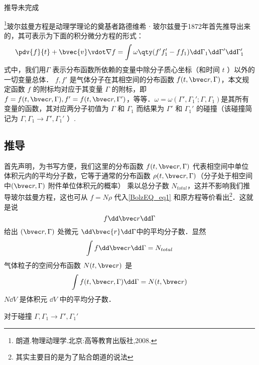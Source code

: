 
\begin{issues}

\issueDraft
推导未完成
\end{issues}

\footnote{朗道.物理动理学.北京:高等教育出版社,2008.}玻尔兹曼方程是动理学理论的奠基者路德维希 $\cdot$ 玻尔兹曼于1872年首先推导出来的，其可表示为下面的积分微分方程的形式：
\begin{equation}\label{BolzEQ_eq1}
\pdv{f}{t}+\bvec{v}\vdot\nabla f=\int\omega\qty(f'f_1'-ff_1)\dd\Gamma_1\dd\Gamma'\dd\Gamma_1'
\end{equation}
式中，我们用$\Gamma$ 表示分布函数所依赖的变量中除分子质心坐标（和时间 $t$ ）以外的一切变量总体． $f,f'$ 是气体分子在其相空间的分布函数 $f(t,\bvec r,\Gamma)$，本文规定函数 $f$ 的附标均对应于其变量 $\Gamma$ 的附标，即$f=f(t,\bvec r,\Gamma),f'=f(t,\bvec r,\Gamma')$，等等．$\omega=\omega(\Gamma',\Gamma_1';\Gamma,\Gamma_1)$是其所有变量的函数，其对应两分子初值为 $\Gamma$ 和 $\Gamma_1$ 而结果为 $\Gamma'$ 和 $\Gamma_1'$ 的碰撞（该碰撞简记为 $\Gamma,\Gamma_1\rightarrow\Gamma',\Gamma_1'$ ）. 
\subsection{推导}
首先声明，为书写方便，我们这里的分布函数 $f(t,\bvec r,\Gamma)$ 代表相空间中单位体积元内的平均分子数，它等于通常的分布函数 $\rho(t,\bvec r,\Gamma)$（分子处于相空间中$(\bvec r,\Gamma)$ 附件单位体积元的概率） 乘以总分子数 $N_{total}$，这并不影响我们推导玻尔兹曼方程，这也可从 $f=N\rho$ 代入\autoref{BolzEQ_eq1} 和原方程等价看出\footnote{其实主要目的是为了贴合朗道的说法}．这就是说
\begin{equation}
f\dd \bvec r\dd\Gamma
\end{equation}
给出 $(\bvec r,\Gamma)$ 处微元 $\dd\bvec{r}\dd\Gamma$中的平均分子数．显然
\begin{equation}
\int f\dd \bvec r\dd\Gamma=N_{total}
\end{equation}
气体粒子的空间分布函数 $N(t,\bvec r)$ 是
\begin{equation}
\int f(t,\bvec r,\Gamma)\dd \Gamma=N(t,\bvec r)
\end{equation}
 $N\dd V$ 是体积元 $\dd V$ 中的平均分子数．

 对于碰撞 $\Gamma,\Gamma_1\rightarrow\Gamma',\Gamma_1'$
